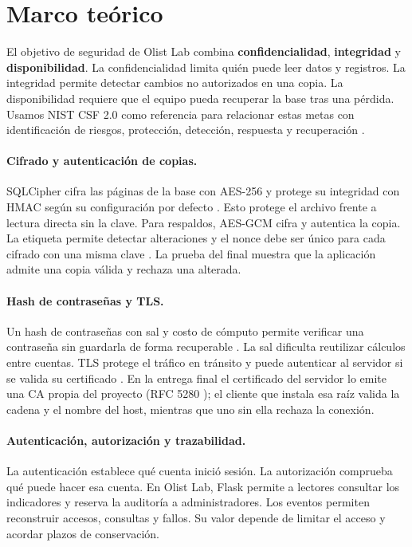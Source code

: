 \section{Marco teórico}
\label{sec:marco-teorico}
El objetivo de seguridad de Olist Lab combina \textbf{confidencialidad}, \textbf{integridad} y \textbf{disponibilidad}. La confidencialidad limita quién puede leer datos y registros. La integridad permite detectar cambios no autorizados en una copia. La disponibilidad requiere que el equipo pueda recuperar la base tras una pérdida. Usamos NIST CSF 2.0 como referencia para relacionar estas metas con identificación de riesgos, protección, detección, respuesta y recuperación \cite{nistcsf}.

\paragraph{Cifrado y autenticación de copias.} SQLCipher cifra las páginas de la base con AES-256 y protege su integridad con HMAC según su configuración por defecto \cite{sqlcipher}. Esto protege el archivo frente a lectura directa sin la clave. Para respaldos, AES-GCM cifra y autentica la copia. La etiqueta permite detectar alteraciones y el nonce debe ser único para cada cifrado con una misma clave \cite{gcm}. La prueba del final muestra que la aplicación admite una copia válida y rechaza una alterada.

\paragraph{Hash de contraseñas y TLS.} Un hash de contraseñas con sal y costo de cómputo permite verificar una contraseña sin guardarla de forma recuperable \cite{owasp}. La sal dificulta reutilizar cálculos entre cuentas. TLS protege el tráfico en tránsito y puede autenticar al servidor si se valida su certificado \cite{tls}. En la entrega final el certificado del servidor lo emite una CA propia del proyecto (RFC 5280 \cite{x509}); el cliente que instala esa raíz valida la cadena y el nombre del host, mientras que uno sin ella rechaza la conexión.

\paragraph{Autenticación, autorización y trazabilidad.} La autenticación establece qué cuenta inició sesión. La autorización comprueba qué puede hacer esa cuenta. En Olist Lab, Flask permite a lectores consultar los indicadores y reserva la auditoría a administradores. Los eventos permiten reconstruir accesos, consultas y fallos. Su valor depende de limitar el acceso y acordar plazos de conservación.

